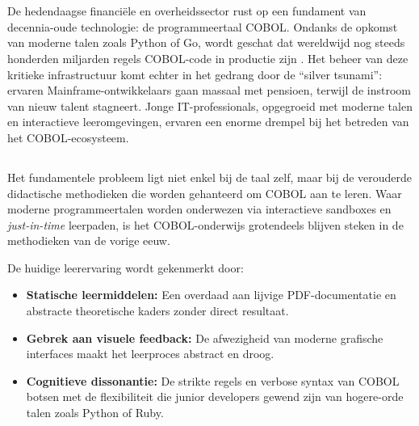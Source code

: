 

\chapter{}%
\label{ch:inleiding}


De hedendaagse financiële en overheidssector rust op een fundament van decennia-oude technologie: de programmeertaal COBOL. 
Ondanks de opkomst van moderne talen zoals Python of Go, wordt geschat dat wereldwijd nog steeds honderden miljarden regels COBOL-code in productie zijn \autocite{IBM2025}.
Het beheer van deze kritieke infrastructuur komt echter in het gedrang door de \enquote{silver tsunami}: ervaren Mainframe-ontwikkelaars gaan massaal met pensioen, terwijl de instroom van nieuw talent stagneert. 
Jonge IT-professionals, opgegroeid met moderne talen en interactieve leeromgevingen, ervaren een enorme drempel bij het betreden van het COBOL-ecosysteem.

\section{}%
\label{sec:probleemstelling}

Het fundamentele probleem ligt niet enkel bij de taal zelf, maar bij de verouderde didactische methodieken die worden gehanteerd om COBOL aan te leren.
Waar moderne programmeertalen worden onderwezen via interactieve sandboxes en \textit{just-in-time} leerpaden, is het COBOL-onderwijs grotendeels blijven steken in de methodieken van de vorige eeuw. 

De huidige leerervaring wordt gekenmerkt door:
\begin{itemize}
    \item \textbf{Statische leermiddelen:} Een overdaad aan lijvige PDF-documentatie en abstracte theoretische kaders zonder direct resultaat.
    \item \textbf{Gebrek aan visuele feedback:} De afwezigheid van moderne grafische interfaces maakt het leerproces abstract en droog.
    \item \textbf{Cognitieve dissonantie:} De strikte regels en verbose syntax van COBOL botsen met de flexibiliteit die junior developers gewend zijn van hogere-orde talen zoals Python of Ruby.
\end{itemize}

